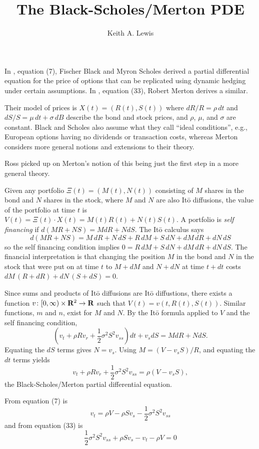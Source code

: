 \documentclass[11pt,letterpaper,fleqn]{article}
\author{Keith A. Lewis}
\title{The Black-Scholes/Merton PDE}
\newcommand{\R}{{\bf{R}}}
\begin{document}
\maketitle

In \cite{BlaSch1973}, equation (7), Fischer Black and Myron Scholes derived a partial
differential equation for the price of options that can be replicated using
dynamic hedging under certain assumptions. In \cite{Mer1973}, equation (33), Robert
Merton derives a similar.

Their model of prices is $X(t) = (R(t), S(t))$ where $dR/R = \rho\,dt$ 
and $dS/S = \mu\,dt + \sigma\,dB$ describe the bond and stock prices, and
$\rho$, $\mu$, and $\sigma$ are constant.
Black and Scholes also assume what they call ``ideal conditions'', e.g.,
European options having no dividends or transaction costs, whereas Merton considers
more general notions and extensions to their theory.

Ross picked up on Merton's notion of this being just the first step in a more
general theory. \cite{Ross}

Given any portfolio $\Xi(t) = (M(t), N(t))$
consisting of $M$ shares in the bond and $N$ shares in the stock, where
$M$ and $N$ are also It\=o diffusions, the value of the portfolio at time $t$ is 
$V(t) = \Xi(t)\cdot X(t) = M(t)R(t) + N(t)S(t)$. A portfolio is {\em self financing} if $d(MR + NS) = M dR + N dS$. The It\=o calculus says 
\[
d(MR + NS) = 
M\,dR + N\,dS + R\,dM + S\,dN + dM\,dR + dN\,dS
\]
so the self financing condition implies $0 = R\,dM + S\,dN + dM\,dR +
dN\,dS$.  The financial interpretation is that changing the position $M$
in the bond and $N$ in the stock that were put on at time $t$ to $M +
dM$ and $N + dN$ at time $t + dt$ costs $dM\,(R + dR) + dN\,(S + dS) = 0$.

Since sums and products of It\=o diffusions are It\=o diffustions, 
there exists a function $v\colon [0,\infty)\times\R^2\to\R$ such that
$V(t) = v(t, R(t), S(t))$. Similar functions, $m$ and $n$, exist for
$M$ and $N$.  By the It\=o formula applied to $V$ and the self financing
condition, 
\[
(v_t + \rho R v_r + \frac{1}{2} \sigma^2 S^2 v_{ss}) dt + v_s dS 
= M dR + N dS.
\]
Equating the $dS$ terms gives $N = v_s$. Using $M =
(V - v_s S)/R$, and equating the $dt$ terms yields 
\[
v_t + \rho R v_r + \frac{1}{2}\sigma^2 S^2 v_{ss} = \rho(V - v_s S),
\]
the Black-Scholes/Merton
partial differential equation.

From \cite{BlaSch1973} equation (7) is
\[v_t = \rho V - \rho S v_s - \frac{1}{2}\sigma^2S^2v_{ss}\]
and from \cite{Mer1973} equation (33) is
\[\frac{1}{2}\sigma^2S^2v_{ss} + \rho S v_s - v_t - \rho V = 0\]
\end{document}
